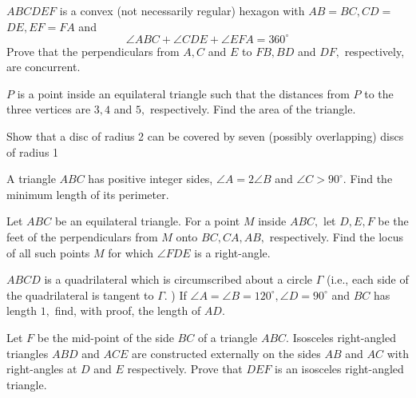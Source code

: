 \documentclass{pset}
\begin{document}
\begin{problems}
\begin{problem}[IrMO 1999 Q10]
    \(A B C D E F\) is a convex (not necessarily regular) hexagon with \(A B=B C, C D=\) \(D E, E F=F A\) and
    $$
    \angle A B C+\angle C D E+\angle E F A=360^{\circ}
    $$
    Prove that the perpendiculars from \(A, C\) and \(E\) to \(F B, B D\) and \(D F,\) respectively, are concurrent.
\end{problem}

\begin{problem}[IrMO 1998 Q2]
    \(P\) is a point inside an equilateral triangle such that the distances from \(P\) to the three vertices are \(3,4\) and \(5,\) respectively. Find the area of the triangle.
\end{problem}

\begin{problem}[IrMO 1998 Q4]
    Show that a disc of radius 2 can be covered by seven (possibly overlapping) discs
    of radius 1
\end{problem}

\begin{problem}[IrMO 1998 Q10]
    A triangle \(A B C\) has positive integer sides, \(\angle A=2 \angle B\) and \(\angle C>90^{\circ} .\) Find the minimum length of its perimeter.
\end{problem}

\begin{problem}[IrMO 1997 Q2]
    Let \(A B C\) be an equilateral triangle. For a point \(M\) inside \(A B C,\) let \(D, E, F\) be the feet of the perpendiculars from \(M\) onto \(B C, C A, A B,\) respectively. Find the locus of all such points \(M\) for which \(\angle F D E\) is a right-angle.
\end{problem}

\begin{problem}[IrMO 1997 Q7]
    \(A B C D\) is a quadrilateral which is circumscribed about a circle \(\Gamma\) (i.e., each side of the quadrilateral is tangent to \(\Gamma .\) ) If \(\angle A=\angle B=120^{\circ}, \angle D=90^{\circ}\) and \(B C\) has length \(1,\) find, with proof, the length of \(A D .\)
\end{problem}

\begin{problem}[IrMO 1996 Q4]
    Let \(F\) be the mid-point of the side \(B C\) of a triangle \(A B C .\) Isosceles right-angled triangles \(A B D\) and \(A C E\) are constructed externally on the sides \(A B\) and \(A C\) with right-angles at \(D\) and \(E\) respectively. Prove that \(D E F\) is an isosceles right-angled triangle.
\end{problem}


\end{problems}
\end{document}
